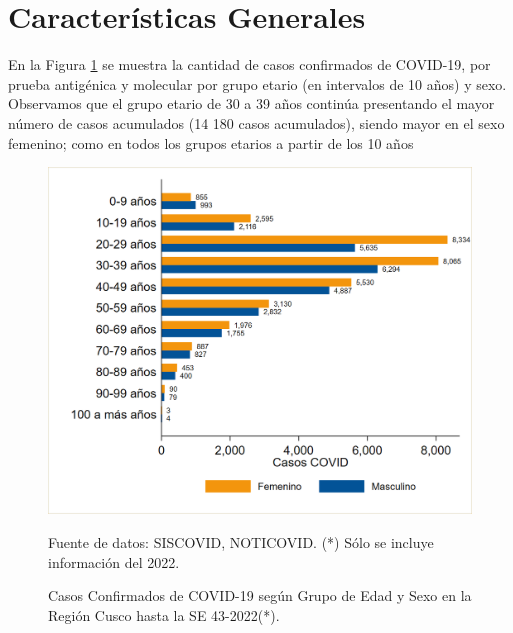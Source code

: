 \documentclass[12pt,a4paper,openany]{book}
\begin{document}
	
	\clearpage	
	\section*{Características Generales}
	\noindent En la Figura \ref{fig:casos_edad_sexo} se muestra la cantidad de casos confirmados de COVID-19, por prueba antigénica y molecular por grupo etario (en intervalos de 10 años) y sexo. Observamos que el grupo
	etario de 30 a 39 años continúa presentando el mayor número de casos acumulados (14 180 casos acumulados), siendo mayor en el sexo femenino; como en todos los grupos etarios a partir de los 10 años 
	
	\begin{figure}[h]
		\caption{Casos Confirmados de COVID-19 según Grupo de Edad y Sexo en la Región Cusco hasta la SE 43-2022(*).}\label{fig:casos_edad_sexo}
		\begin{center}
			\includegraphics[width=0.75\linewidth]{../figuras/casos_etapavida_2022}
		\end{center}
		{\footnotesize {Fuente de datos: SISCOVID, NOTICOVID. (*) Sólo se incluye información del 2022.}}
	\end{figure}
	\pagebreak
	
\end{document}
